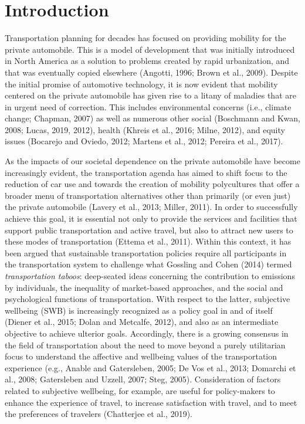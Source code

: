 \documentclass[]{elsarticle} %
\begin{document}
\hypertarget{introduction}{%
\section{Introduction}\label{introduction}}

Transportation planning for decades has focused on providing mobility
for the private automobile. This is a model of development that was
initially introduced in North America as a solution to problems created
by rapid urbanization, and that was eventually copied elsewhere
(Angotti, 1996; Brown et al., 2009). Despite the initial promise of
automotive technology, it is now evident that mobility centered on the
private automobile has given rise to a litany of maladies that are in
urgent need of correction. This includes environmental concerns (i.e.,
climate change; Chapman, 2007) as well as numerous other social
(Boschmann and Kwan, 2008; Lucas, 2019, 2012), health (Khreis et al.,
2016; Milne, 2012), and equity issues (Bocarejo and Oviedo, 2012;
Martens et al., 2012; Pereira et al., 2017).

As the impacts of our societal dependence on the private automobile have
become increasingly evident, the transportation agenda has aimed to
shift focus to the reduction of car use and towards the creation of
mobility polycultures that offer a broader menu of transportation
alternatives other than primarily (or even just) the private automobile
(Lavery et al., 2013; Miller, 2011). In order to successfully achieve
this goal, it is essential not only to provide the services and
facilities that support public transportation and active travel, but
also to attract new users to these modes of transportation (Ettema et
al., 2011). Within this context, it has been argued that sustainable
transportation policies require all participants in the transportation
system to challenge what Gossling and Cohen (2014) termed
\emph{transportation taboos}: deep-seated ideas concerning the
contribution to emissions by individuals, the inequality of market-based
approaches, and the social and psychological functions of
transportation. With respect to the latter, subjective wellbeing (SWB)
is increasingly recognized as a policy goal in and of itself (Diener et
al., 2015; Dolan and Metcalfe, 2012), and also as an intermediate
objective to achieve ulterior goals. Accordingly, there is a growing
consensus in the field of transportation about the need to move beyond a
purely utilitarian focus to understand the affective and wellbeing
values of the transportation experience (e.g., Anable and Gatersleben,
2005; De Vos et al., 2013; Domarchi et al., 2008; Gatersleben and
Uzzell, 2007; Steg, 2005). Consideration of factors related to
subjective wellbeing, for example, are useful for policy-makers to
enhance the experience of travel, to increase satisfaction with travel,
and to meet the preferences of travelers (Chatterjee et al., 2019).
\end{document}
